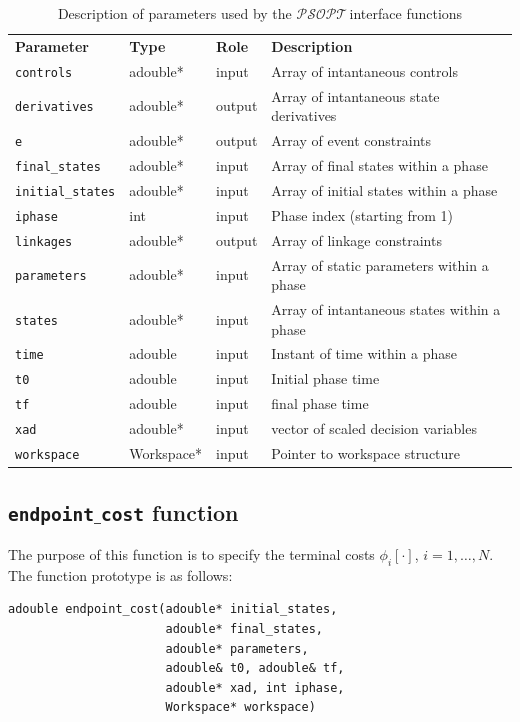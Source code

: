 \documentclass[a4paper,11pt]{report}    %
\newcommand{\psopt}{$\mathcal{PSOPT}$\,}  %
\begin{document}
\begin{table} 
\begin{tabular}{llll}
\textbf{Parameter}      & \textbf{Type}     & \textbf{Role}   & \textbf{Description}                            \\
\verb|controls| & adouble* & input  & Array of intantaneous controls  \\
\verb|derivatives| & adouble* & output  & Array of intantaneous state derivatives  \\
\verb|e| & adouble* & output  & Array of event constraints  \\
\verb|final_states|   & adouble* & input  & Array of final states within a phase \\
\verb|initial_states| & adouble* & input  & Array of initial states within a phase \\
\verb|iphase| & int & input  & Phase index (starting from 1) \\
\verb|linkages| & adouble* & output  & Array of linkage constraints  \\
\verb|parameters| & adouble* & input  & Array of static parameters within a phase \\
\verb|states| & adouble* & input  & Array of intantaneous states within a phase \\
\verb|time| & adouble & input  & Instant of time within a phase\\
\verb|t0| & adouble & input  & Initial  phase time \\
\verb|tf| & adouble & input  & final phase time\\
\verb|xad| & adouble* & input  & vector of scaled decision variables\\
\verb|workspace| & Workspace* & input  & Pointer to workspace structure \\
\end{tabular}
\caption{Description of parameters used by the \psopt interface functions}\label{tab:param}
\end{table}

\subsection{\texttt{endpoint$\_$cost} function}

The purpose of this function is to specify the terminal costs $\phi_i[\cdot]$,  $i=1,\ldots,N$.
The function prototype is as follows:

\begin{verbatim}
adouble endpoint_cost(adouble* initial_states, 
                      adouble* final_states, 
                      adouble* parameters,
                      adouble& t0, adouble& tf, 
                      adouble* xad, int iphase,
                      Workspace* workspace)
\end{verbatim}
\end{document}
